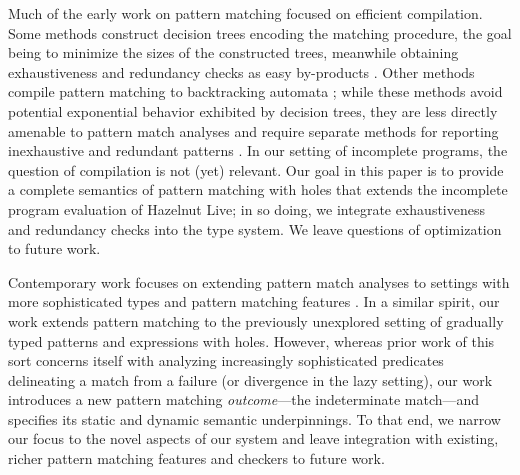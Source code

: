 Much of the early work on pattern matching focused on efficient compilation. Some methods construct decision trees encoding the matching procedure, the goal being to minimize the sizes of the constructed trees, meanwhile obtaining exhaustiveness and redundancy checks as easy by-products \cite{Aitken92smlnj,Baudinet85treepattern,Sestoft96mlpattern}.
Other methods compile pattern matching to backtracking automata \cite{Maranget94lazybacktracking,DBLP:journals/jfp/Maranget07};
while these methods avoid potential exponential behavior exhibited by decision trees, they are less directly amenable to pattern match analyses and require separate methods for reporting inexhaustive and redundant patterns \cite{DBLP:journals/jfp/Maranget07}.
In our setting of incomplete programs, the question of compilation is not (yet) relevant. Our goal in this paper is to provide a complete semantics of pattern matching with holes that extends the incomplete program evaluation of Hazelnut Live; in so doing, we integrate exhaustiveness and redundancy checks into the type system.
We leave questions of optimization to future work.

Contemporary work focuses on extending pattern match analyses to settings with more sophisticated types and pattern matching features \cite{DBLP:conf/icfp/VazouSJVJ14,DBLP:journals/pacmpl/CockxA18,DBLP:conf/itp/Sozeau10,DBLP:conf/icfp/KarachaliasSVJ15,DBLP:journals/pacmpl/GrafJS20}.
In a similar spirit, our work extends pattern matching to the previously unexplored setting of gradually typed patterns and expressions with holes.
However, whereas prior work of this sort concerns itself with analyzing increasingly sophisticated predicates delineating a match from a failure (or divergence in the lazy setting), our work introduces a new pattern matching \emph{outcome}---the indeterminate match---and specifies its static and dynamic semantic underpinnings.
To that end, we narrow our focus to the novel aspects of our system and leave integration with existing, richer pattern matching features and checkers to future work.





